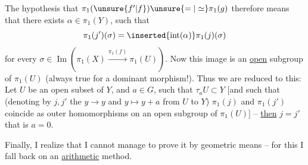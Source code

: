 The hypothesis that $\pi_1(\unsure{f'|f})\unsure{=|\simeq}\pi_1(g)$ therefore means that there exists $\alpha\in\pi_1(Y)$, such that
\[
\pi_1(j')(\sigma)=\inserted{\operatorname{int}(\alpha)}\pi_1(j)(\sigma)
\]
for every $\sigma\in\operatorname{Im}(\pi_1(X)\xrightarrow{\pi_1(f)}\pi_1(U))$. Now this image is an \uline{open} subgroup of $\pi_1(U)$ (always true for a dominant morphism!).  Thus we are reduced to this: Let $U$ be an open subset \inserted{$\ne\varnothing$} of $Y$, and $a\in G$, such that $\tau_aU\subset Y$ [and such that (denoting by $j,j'$ the   $y\longrightarrow y$ and $y\longmapsto y+a$ from $U$ to $Y$) $\pi_1(j)$ and $\pi_1(j')$ coincide as outer homomorphisms on an open subgroup of $\pi_1(U)$] -- \uline{then} $j=j'$ that is $a=0$.


Finally, I realize that I cannot manage to prove it by geometric means -- for this I fall back on an \uline{arithmetic} method.

